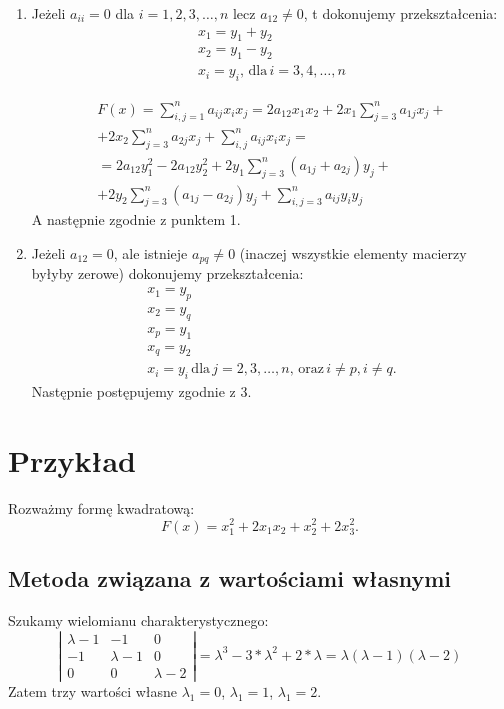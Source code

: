\documentclass{article}
\begin{document}
\begin{enumerate}
    \item Jeżeli $a_{ii} = 0$ dla $i = 1, 2, 3, \dots, n$ lecz $a_{12} \neq 0$, t dokonujemy przekształcenia:
    $$
        \begin{array}{l}
             x_{1} = y_{1} + y_{2}\\
             x_{2} = y_{1} - y_{2}\\
             x_{i} = y_{i},\, \text{dla}\, i = 3, 4, \dots, n
        \end{array}
    $$

    $$
        \begin{array}{l}
             F(x) = \sum_{i,j=1}^{n}{a_{ij}x_{i}x_{j}} = 2a_{12}x_{1}x_{2} + 2x_{1}\sum_{j=3}^{n}{a_{1j}x_{j}} + \\
             +2x_{2}\sum_{j=3}^{n}{a_{2j}x_{j}} + \sum_{i,j}^{n}{a_{ij}x_{i}x_{j}} = \\
             = 2a_{12}y_{1}^{2} - 2a_{12}y_{2}^{2} + 2y_{1}\sum_{j=3}^{n}{(a_{1j}+a_{2j})y_{j}} + \\
             + 2y_{2}\sum_{j=3}^{n}{(a_{1j}-a_{2j})y_{j}} + \sum_{i,j=3}^{n}{a_{ij}y_{i}y_{j}}
        \end{array}
    $$
    A następnie zgodnie z punktem 1.

    \item Jeżeli $a_{12} = 0$, ale istnieje $a_{pq} \neq 0$ (inaczej wszystkie elementy macierzy byłyby zerowe) dokonujemy przekształcenia:
    $$
        \begin{array}{l}
             x_{1} = y_{p}\\
             x_{2} = y_{q}\\
             x_{p} = y_{1}\\
             x_{q} = y_{2}\\
             x_{i} = y_{i}\,\text{dla}\, j = 2,3,\dots, n,\,\text{oraz}\, i\neq p, i \neq q.
        \end{array}
    $$
    Następnie postępujemy zgodnie z 3.
\end{enumerate}


\section{Przykład}
Rozważmy formę kwadratową:
$$
    F(x) = x_{1}^{2} + 2x_{1}x_{2} + x_{2}^{2} + 2x_{3}^{2}.
$$

\subsection{Metoda związana z wartościami własnymi}
Szukamy wielomianu charakterystycznego:
$$
    \left| \begin{array}{ccc} \lambda - 1 & -1 & 0\\ -1 & \lambda -1 & 0\\ 0 & 0 & \lambda -2 \end{array} \right| = \lambda^3 - 3*\lambda^2 + 2*\lambda = \lambda(\lambda - 1)(\lambda - 2)
$$
Zatem trzy wartości własne $\lambda_1 = 0$, $\lambda_1 = 1$, $\lambda_1 = 2$.
\end{document}
